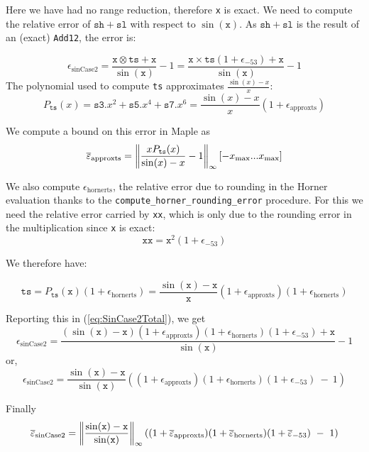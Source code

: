 Here we have had no range reduction, therefore \texttt{x} is exact.
We need to compute the relative error of $\mathtt{sh}+\mathtt{sl}$
with respect to $\sin(\mathtt{x})$. As $\mathtt{sh}+\mathtt{sl}$ is
the result of an (exact) \texttt{Add12}, the error is:

\begin{equation}
  \epsilon_{\mathrm{sinCase2}} = \frac{\mathtt{x}\otimes \mathtt{ts} + \mathtt{x}}{\sin(\mathtt{x})} -1 = \frac{\mathtt{x}\times\mathtt{ts}(1+\epsilon_{-53}) + \mathtt{x}}{\sin(\mathtt{x})} -1
\label{eq:SinCase2Total}
\end{equation}
The polynomial used to compute \texttt{ts}
approximates $\frac{\sin(x)-x}{x}$: 
$$
P_{\mathtt{ts}}(x) = \mathtt{s3}.x^2 + \mathtt{s5}.x^4 + \mathtt{s7}.x^6
= \frac{\sin(x)-x}{x}(1+\epsilon_{\mathrm{approxts}})
$$

We compute a bound on this error in Maple as 
$${\overline{\varepsilon}}_{\mathrm{approxts}} = \left\Vert \frac{xP_{\mathtt{ts}}(x)}{\sin(x)-x} -1 \right\Vert_{\infty}[-x_{\mathrm{max}}...x_{\mathrm{max}}]$$

We also compute $\epsilon_{\mathrm{hornerts}}$, the relative error due
to rounding in the Horner evaluation thanks to the
\texttt{compute\_horner\_rounding\_error} procedure. For this we need
the relative error carried by \texttt{xx}, which is only due to the
rounding error in the multiplication since \texttt{x} is exact:
$$\mathtt{xx}=\mathtt{x}^2(1+\epsilon_{-53})$$

We therefore have:

$$\mathtt{ts} = P_{\mathtt{ts}}(\mathtt{x})(1+\epsilon_{\mathrm{hornerts}}) = \frac{\sin(\mathtt{x})-\mathtt{x}}{\mathtt{x}}(1+\epsilon_{\mathrm{approxts}})(1+\epsilon_{\mathrm{hornerts}})$$

Reporting this in (\ref{eq:SinCase2Total}), we get 
\begin{equation*}
  \epsilon_{\mathrm{sinCase2}} = \frac{(\sin(\mathtt{x})-\mathtt{x})(1+\epsilon_{\mathrm{approxts}})(1+\epsilon_{\mathrm{hornerts}})(1+\epsilon_{-53}) + \mathtt{x}}{\sin(\mathtt{x})} -1
\end{equation*}
or,
\begin{equation*}
  \epsilon_{\mathrm{sinCase2}} =  \frac{\sin(\mathtt{x})-\mathtt{x}}{\sin(\mathtt{x})}\left((1+\epsilon_{\mathrm{approxts}})(1+\epsilon_{\mathrm{hornerts}})(1+\epsilon_{-53})\ -\ 1\right)
\end{equation*}

Finally
\begin{equation}
  \maxeps_{\mathrm{sinCase2}} =  \left\Vert\frac{\sin(\mathtt{x})-\mathtt{x}}{\sin(\mathtt{x})}\right\Vert_{\infty}((1+\maxeps_{\mathrm{approxts}})(1+\maxeps_{\mathrm{hornerts}})(1+\maxeps_{-53})\ -\ 1)
  \label{eq:SinCase2Total2}
\end{equation}
 



